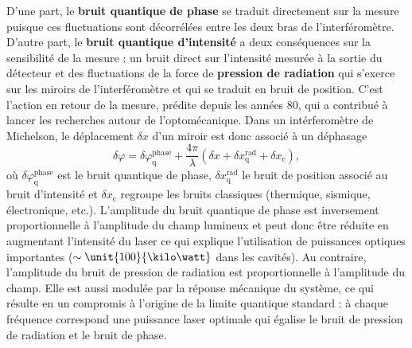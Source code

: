 \documentclass[12pt,a4paper]{article}
\begin{document}
D'une part, le \textbf{bruit quantique de phase} se traduit directement sur la mesure puisque ces fluctuations sont décorrélées entre les deux bras de l'interféromètre.
D'autre part, le \textbf{bruit quantique d'intensité} a deux conséquences sur la sensibilité de la mesure : un bruit direct sur l'intensité mesurée à la sortie du détecteur et des fluctuations de la force de \textbf{pression de radiation} qui s'exerce sur les miroirs de l'interféromètre et qui se traduit en bruit de position.
C'est l'action en retour de la mesure, prédite depuis les années 80, qui a contribué à lancer les recherches autour de l'optomécanique.
Dans un intérferomètre de Michelson, le déplacement $\delta x$ d'un miroir est donc associé à un déphasage
\begin{equation}
\delta \varphi = \delta \varphi ^\mathrm{phase} _\mathrm{q} + \frac{4\pi}{\lambda} ( \delta x + \delta x ^\mathrm{rad} _\mathrm{q} + \delta x_\mathrm{c}),
\end{equation}
où $\delta \varphi ^\mathrm{phase} _\mathrm{q}$ est le bruit quantique de phase, $\delta x ^\mathrm{rad} _\mathrm{q}$ le bruit de position associé au bruit d'intensité et $\delta x_\mathrm{c}$ regroupe les bruits classiques (thermique, sismique, électronique, etc.).
L'amplitude du bruit quantique de phase est inversement proportionnelle à l'amplitude du champ lumineux et peut donc être réduite en augmentant l'intensité du laser ce qui explique l'utilisation de puissances optiques importantes ($\sim \unit{100}{\kilo\watt}$ dans les cavités).
Au contraire, l'amplitude du bruit de pression de radiation est proportionnelle à l'amplitude du champ.
Elle est aussi modulée par la réponse mécanique du système, ce qui résulte en un compromis à l'origine de la limite quantique standard : à chaque fréquence correspond une puissance laser optimale qui égalise le bruit de pression de radiation et le bruit de phase.
\end{document}
